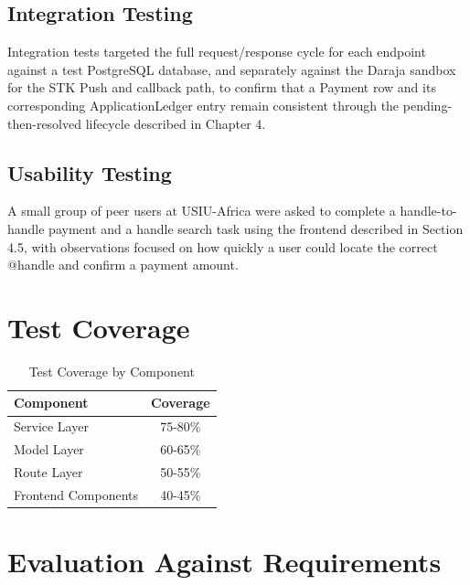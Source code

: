 \documentclass[12pt, a4paper, twoside, openright]{report}
\begin{document}
\subsection{Integration Testing}

Integration tests targeted the full request/response cycle for each endpoint against a test PostgreSQL database, and separately against the Daraja sandbox for the STK Push and callback path, to confirm that a Payment row and its corresponding ApplicationLedger entry remain consistent through the pending-then-resolved lifecycle described in Chapter 4.

\subsection{Usability Testing}

A small group of peer users at USIU-Africa were asked to complete a handle-to-handle payment and a handle search task using the frontend described in Section 4.5, with observations focused on how quickly a user could locate the correct @handle and confirm a payment amount.

\section{Test Coverage}

\begin{table}[H]
    \centering
    \begin{tabularx}{\textwidth}{|l|c|}
    \hline
    \textbf{Component} & \textbf{Coverage} \\
    \hline
    Service Layer & 75-80\% \\
    \hline
    Model Layer & 60-65\% \\
    \hline
    Route Layer & 50-55\% \\
    \hline
    Frontend Components & 40-45\% \\
    \hline
    \end{tabularx}
    \caption{Test Coverage by Component}
\end{table}

\section{Evaluation Against Requirements}
\end{document}
